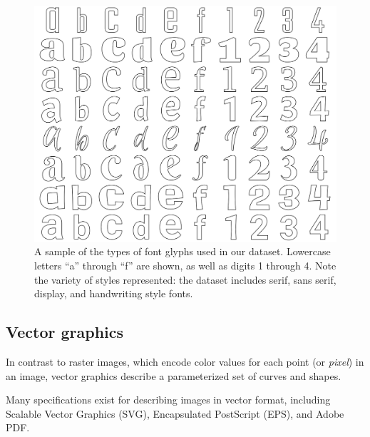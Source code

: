 \begin{figure}[]
	\includegraphics[width=\textwidth]{figures/input_fonts}
    \caption[A sample of the types of font faces used in our fonts dataset]{A sample of the types of font glyphs used in our dataset. Lowercase letters ``a'' through ``f'' are shown, as well as digits 1 through 4. Note the variety of styles represented: the dataset includes serif, sans serif, display, and handwriting style fonts.\label{fig:input_fonts}}
\end{figure}

\subsection{Vector graphics}
In contrast to raster images, which encode color values for each point (or \textit{pixel}) in an image, vector graphics describe a parameterized set of curves and shapes.

Many specifications exist for describing images in vector format, including Scalable Vector Graphics (SVG), Encapsulated PostScript (EPS), and Adobe PDF.

